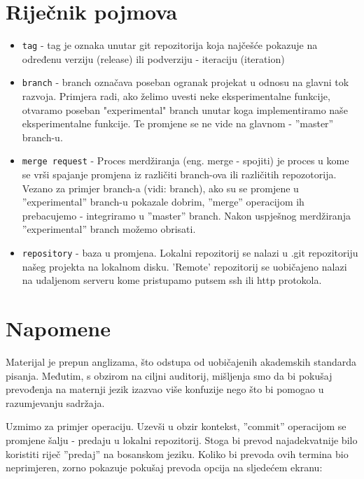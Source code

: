 \documentclass[times, utf8, seminar]{fit}
\begin{document}
\chapter{Riječnik pojmova}

\begin{itemize}
    \item \texttt{tag} - tag je oznaka unutar git repozitorija koja najčešće pokazuje na određenu verziju (release) ili podverziju - iteraciju (iteration)

    \item \texttt{branch} - branch označava poseban ogranak projekat u odnosu na glavni tok razvoja. Primjera radi, ako želimo uvesti neke eksperimentalne funkcije, otvaramo poseban "experimental" branch unutar koga implementiramo naše eksperimentalne funkcije. Te promjene se ne vide na glavnom - ''master'' branch-u.
    \item \texttt{merge request} - Proces merdžiranja (eng. merge - spojiti) je proces u kome se vrši spajanje promjena iz različiti branch-ova ili različitih repozotorija. Vezano za primjer branch-a (vidi: branch), ako su se promjene u ''experimental'' branch-u pokazale dobrim, ''merge'' operacijom ih prebacujemo - integriramo u ''master'' branch. Nakon uspješnog merdžiranja ''experimental'' branch možemo obrisati.
   \item \texttt{repository} - baza u promjena. Lokalni repozitorij se nalazi u .git repozitoriju našeg projekta na lokalnom disku. 'Remote' repozitorij se uobičajeno nalazi na udaljenom serveru kome pristupamo putsem ssh ili http protokola.
\end{itemize}

\chapter{Napomene}

Materijal je prepun anglizama, što odstupa od uobičajenih akademskih standarda pisanja. Međutim, s obzirom na ciljni auditorij, mišljenja smo da bi pokušaj prevođenja na maternji jezik izazvao više konfuzije nego što bi pomogao u razumjevanju sadržaja.

Uzmimo za primjer \href{http://translate.google.com/#en/hr/commit}{\color{blue}{''commit''}} operaciju.
Uzevši u obzir kontekst, ''commit'' operacijom se promjene šalju - predaju u lokalni repozitorij.
Stoga bi prevod najadekvatnije bilo koristiti riječ ''predaj'' na bosanskom jeziku.
Koliko bi prevoda ovih termina bio neprimjeren, zorno pokazuje pokušaj prevoda opcija na sljedećem ekranu:
\end{document}
